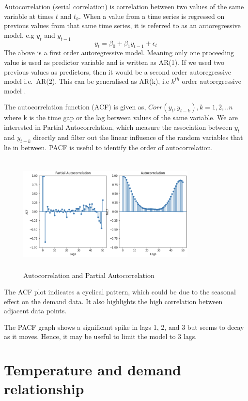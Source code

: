 \documentclass[mstat,12pt]{unswthesis}
\begin{document}
Autocorrelation (serial correlation) is correlation between two values
of the same variable at times \(t\) and \(t_k\). When a value from a
time series is regressed on previous values from that same time series,
it is referred to as an autoregressive model. e.g \(y_t\) and
\(y_{t-1}\) \[ 
y_t = \beta_0 + \beta_1 y_{t-1} + \epsilon_t
\] The above is a first order autoregressive model. Meaning only one
proceeding value is used as predictor variable and is written as AR(1).
If we used two previous values as predictors, then it would be a second
order autoregressive model i.e.~AR(2). This can be generalised as AR(k),
i.e \(k^{th}\) order autoregressive model
\cite{thepennsylvaniastateuniversity_102}.

The autocorrelation function (ACF) is given as,
\(Corr(y_t,y_{t-k}),k=1,2,..n\) \cite{nist_2020_13512} where k is the
time gap or the lag between values of the same variable. We are
interested in Partial Autocorrelation, which measure the association
between \(y_t\) and \(y_{t-k}\) directly and filter out the linear
influence of the random variables that lie in between. PACF is useful to
identify the order of autocorrelation.

\begin{figure}[H]
\centering
\includegraphics[width=0.80\textwidth,height=6cm]{autocorrelation.png}
\caption{Autocorrelation and Partial Autocorrelation}
\label{autocorrelation}
\end{figure}

The ACF plot indicates a cyclical pattern, which could be due to the
seasonal effect on the demand data. It also highlights the high
correlation between adjacent data points.

The PACF graph shows a significant spike in lags 1, 2, and 3 but seems
to decay as it moves. Hence, it may be useful to limit the model to 3
lags.

\hypertarget{temperature-and-demand-relationship}{%
\section{Temperature and demand
relationship}\label{temperature-and-demand-relationship}}
\end{document}

